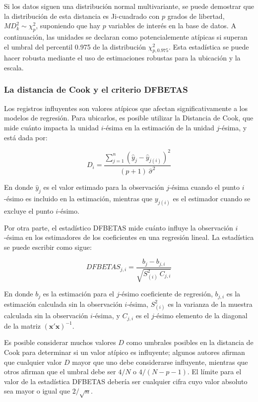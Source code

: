 \documentclass[
  10pt,
  spanish,
]{book}
\begin{document}
Si los datos siguen una distribución normal multivariante, se puede demostrar que la distribución de esta distancia es Ji-cuadrado con \(p\) grados de libertad, \(MD_k^2\sim\chi_p^2\), suponiendo que hay \(p\) variables de interés en la base de datos. A continuación, las unidades se declaran como potencialemente atípicas si superan el umbral del percentil 0.975 de la distribución \(\chi_{p,0.975}^2\). Esta estadística se puede hacer robusta mediante el uso de estimaciones robustas para la ubicación y la escala.

\hypertarget{la-distancia-de-cook-y-el-criterio-dfbetas}{%
\subsubsection*{La distancia de Cook y el criterio DFBETAS}\label{la-distancia-de-cook-y-el-criterio-dfbetas}}

Los registros influyentes son valores atípicos que afectan significativamente a los modelos de regresión. Para ubicarlos, es posible utilizar la Distancia de Cook, que mide cuánto impacta la unidad \(i\)-ésima en la estimación de la unidad \(j\)-ésima, y está dada por:

\[
D_i=\frac{\sum_{j=1}^{n}(\hat y_j- \hat y_{j(i)})^2}{(p+1) \ {\hat{\sigma}}^2}
\]

En donde \(\hat y_j\) es el valor estimado para la observación \(j\)-ésima cuando el punto \(i\)-ésimo es incluido en la estimación, mientras que \(y_{j(i)}\) es el estimador cuando se excluye el punto \(i\)-ésimo.

Por otra parte, el estadístico DFBETAS mide cuánto influye la observación \(i\)-ésima en los estimadores de los coeficientes en una regresión lineal. La estadística se puede escribir como sigue:

\[
DFBETAS_{j,i}=\frac{b_j-b_{j,i}}{\sqrt{S_{(i)}^2 \ C_{j,i}}}
\]

En donde \(b_j\) es la estimación para el \(j\)-ésimo coeficiente de regresión, \(b_{j,i}\) es la estimación calculada sin la observación \(i\)-ésima, \(S_{(i)}^2\) es la varianza de la muestra calculada sin la observación \(i\)-ésima, y \(C_{j,i}\) es el \(j\)-ésimo elemento de la diagonal de la matriz \((\mathbf{x}'\mathbf{x})^{-1}\).

Es posible considerar muchos valores \(D\) como umbrales posibles en la distancia de Cook para determinar si un valor atípico es influyente; algunos autores afirman que cualquier valor \(D\) mayor que uno debe considerarse influyente, mientras que otros afirman que el umbral debe ser \(4/N\) o \(4/(N-p-1)\). El límite para el valor de la estadística DFBETAS debería ser cualquier cifra cuyo valor absoluto sea mayor o igual que \(2/\sqrt n\).
\end{document}
